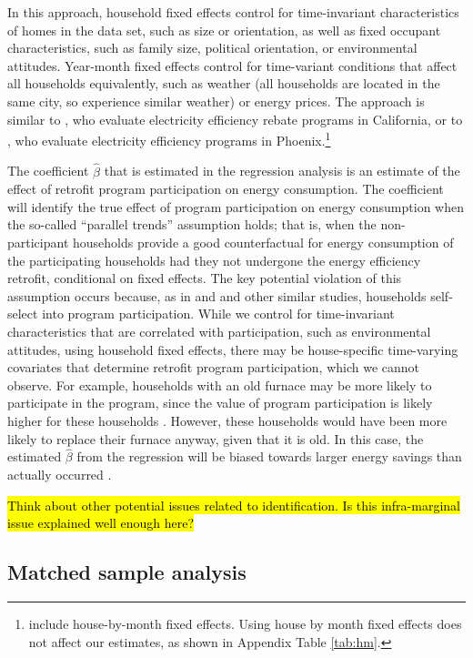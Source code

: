 \documentclass{article}
\newcommand{\hlc}[2][yellow]{ {\sethlcolor{#1} \hl{#2}} }
\begin{document}
In this approach, household fixed effects control for time-invariant characteristics of homes in the data set, such as size or orientation, as well as fixed occupant characteristics, such as family size, political orientation, or environmental attitudes. Year-month fixed effects control for time-variant conditions that affect all households equivalently, such as weather (all households are located in the same city, so experience similar weather) or energy prices. The approach is similar to \cite{chuang2022residential}, who evaluate electricity efficiency rebate programs in California, or to \cite{liang2018energy}, who evaluate electricity efficiency programs in Phoenix.\footnote{\cite{chuang2022residential} include house-by-month fixed effects. Using house by month fixed effects does not affect our estimates, as shown in Appendix Table \ref{tab:hm}.}

The coefficient $\hat{\beta}$ that is estimated in the regression analysis is an estimate of the effect of retrofit program participation on energy consumption. The coefficient will identify the true effect of program participation on energy consumption when the so-called ``parallel trends'' assumption holds; that is, when the non-participant households provide a good counterfactual for energy consumption of the participating households had they not undergone the energy efficiency retrofit, conditional on fixed effects. The key potential violation of this assumption occurs because, as in \cite{liang2018energy} and \cite{chuang2022residential} and other similar studies, households self-select into program participation. While we control for time-invariant characteristics that are correlated with participation, such as environmental attitudes, using household fixed effects, there may be house-specific time-varying covariates that determine retrofit program participation, which we cannot observe. For example, households with an old furnace may be more likely to participate in the program, since the value of program participation is likely higher for these households \citep{rivers2016free}. However, these households would have been more likely to replace their furnace anyway, given that it is old. In this case, the estimated $\hat{\beta}$ from the regression will be biased towards larger energy savings than actually occurred \citep{boomhower2014credible}.

\hlc{Think about other potential issues related to identification. Is this infra-marginal issue explained well enough here?}

\subsection{Matched sample analysis}
\end{document}
